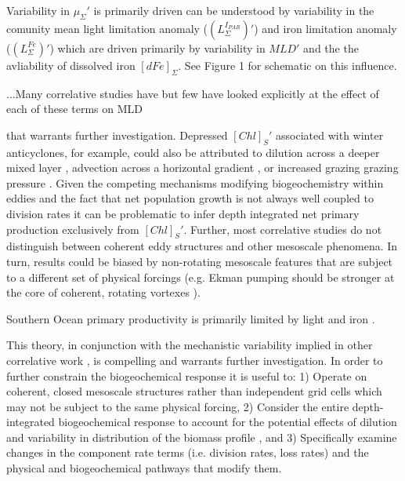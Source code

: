 Variability in $\mu_\Sigma'$ is primarily driven can be understood by variability in the comunity mean light limitation anomaly ($(L_\Sigma^{I_{PAR}})'$) and iron limitation anomaly ($(L_\Sigma^{Fe})'$) which are driven primarily by variability in $MLD'$ and the the avliability of dissolved iron $[dFe]_\Sigma$. See Figure 1 for schematic on this influence.

...Many correlative studies have but few have looked explicitly at the effect of each of these terms on MLD


that warrants further investigation. Depressed $[Chl]_{S}'$ associated with winter anticyclones, for example, could also be attributed to dilution across a deeper mixed layer \parencite{BehrenfeldAnnualcyclesecological2013}, advection across a horizontal gradient \parencite{FrengerImprintSouthernOcean2018}, or increased grazing grazing pressure \parencite{RohrVariabilitymechanismscontrolling2017}. Given the competing mechanisms modifying biogeochemistry within eddies \parencite{McGillicuddyMechanismsPhysicalBiologicalBiogeochemicalInteraction2016} and the fact that net population growth is not always well coupled to division rates \parencite{RohrVariabilitymechanismscontrolling2017,BehrenfeldAnnualcyclesecological2013} it can be problematic to infer depth integrated net primary production exclusively from $[Chl]_{S}'$. Further, most correlative studies do not distinguish between coherent eddy structures and other mesoscale phenomena. In turn, results could be biased by non-rotating mesoscale features that are subject to a different set of physical forcings (e.g. Ekman pumping should be stronger at the core of coherent, rotating vortexes \parencite{GaubeSatelliteObservationsMesoscale2014}).

Southern Ocean primary productivity is primarily limited by light \parencite{Fauchereauresponsephytoplanktonbiomass2011} and iron \parencite{BoydEnvironmentalFactorsControlling2002}. 



This theory, in conjunction with the mechanistic variability implied in other correlative work \parencite{GaubeSatelliteObservationsMesoscale2014}, is compelling and warrants further investigation. In order to further constrain the biogeochemical response it is useful to: 1) Operate on coherent, closed mesoscale structures rather than independent grid cells which may not be subject to the same physical forcing, 2) Consider the entire depth-integrated biogeochemical response to account for the potential effects of dilution and variability in distribution of the biomass profile \parencite{BehrenfeldAnnualcyclesecological2013}, and 3) Specifically examine changes in the component rate terms (i.e. division rates, loss rates) and the physical and biogeochemical pathways that modify them. 



